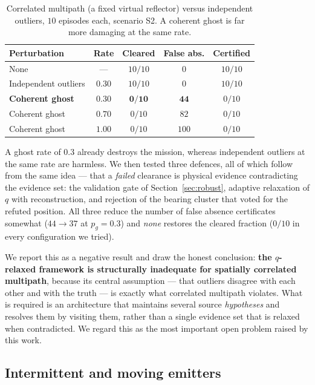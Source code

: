 \documentclass[preprint,12pt,3p]{elsarticle}
\theoremstyle{definition}
\begin{document}
\begin{table}[t]
\caption{Correlated multipath (a fixed virtual reflector) versus independent outliers, $10$
episodes each, scenario S2. A coherent ghost is far more damaging at the same rate.}
\label{tab:ghost}
\centering
\small
\begin{tabular}{lcccc}
\toprule
Perturbation & Rate & Cleared & \textbf{False abs.} & Certified \\
\midrule
None                        & ---   & $10/10$ & $0$   & $10/10$ \\
Independent outliers        & $0.30$ & $10/10$ & $0$   & $10/10$ \\
\textbf{Coherent ghost}     & $0.30$ & $\bm{0/10}$ & $\bm{44}$ & $0/10$ \\
Coherent ghost              & $0.70$ & $0/10$ & $82$  & $0/10$ \\
Coherent ghost              & $1.00$ & $0/10$ & $100$ & $0/10$ \\
\bottomrule
\end{tabular}
\end{table}

A ghost rate of $0.3$ already destroys the mission, whereas independent outliers at the same rate
are harmless. We then tested three defences, all of which follow from the same idea --- that a
\emph{failed} clearance is physical evidence contradicting the evidence set: the validation gate of
Section~\ref{sec:robust}, adaptive relaxation of $q$ with reconstruction, and rejection of the
bearing cluster that voted for the refuted position. All three reduce the number of false absence
certificates somewhat ($44\to37$ at $p_g=0.3$) and \emph{none} restores the cleared fraction
($0/10$ in every configuration we tried).

We report this as a negative result and draw the honest conclusion: \textbf{the
$q$-relaxed framework is structurally inadequate for spatially correlated multipath}, because its
central assumption --- that outliers disagree with each other and with the truth --- is exactly
what correlated multipath violates. What is required is an architecture that maintains several
source \emph{hypotheses} and resolves them by visiting them, rather than a single evidence set that
is relaxed when contradicted. We regard this as the most important open problem raised by this
work.

\subsection{Intermittent and moving emitters}
\label{sec:burst}
\end{document}
